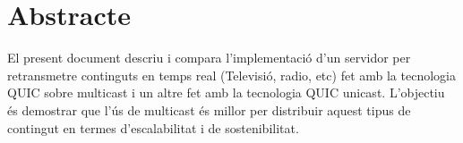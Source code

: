 \section*{Abstracte}

{
    El present document descriu i compara l'implementació d'un servidor per retransmetre continguts en temps real (Televisió, radio, etc) fet amb la tecnologia QUIC
    sobre multicast i un altre fet amb la tecnologia QUIC unicast. L'objectiu és demostrar que l'ús de multicast és millor per distribuir 
    aquest tipus de contingut en termes d'escalabilitat i de sostenibilitat. 
}

